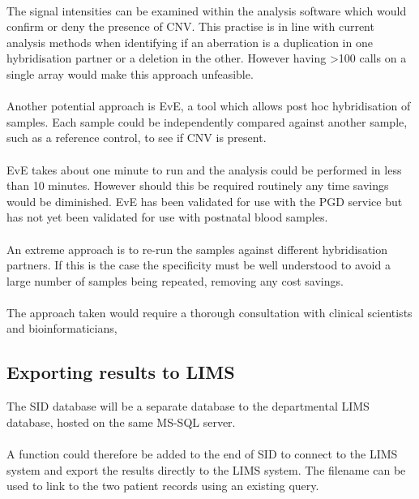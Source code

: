 \paragraph*{}
The signal intensities can be examined within the analysis software which would confirm or deny the presence of CNV. This practise is in line with current analysis methods when identifying if an aberration is a duplication in one hybridisation partner or a deletion in the other. However having \textgreater 100 calls on a single array would make this approach unfeasible.
\paragraph*{}
Another potential approach is EvE, a tool which allows post hoc hybridisation of samples. Each sample could be independently compared against another sample, such as a reference control, to see if CNV is present. 
\paragraph*{}
EvE takes about one minute to run and the analysis could be performed in less than 10 minutes. However should this be required routinely any time savings would be diminished.
EvE has been validated for use with the PGD service but has not yet been validated for use with postnatal blood samples.
\paragraph*{}
An extreme approach is to re-run the samples against different hybridisation partners. If this is the case the specificity must be well understood to avoid a large number of samples being repeated, removing any cost savings.
\paragraph*{}
The approach taken would require a thorough consultation with clinical scientists and bioinformaticians,

\subsection{Exporting results to LIMS}
The SID database will be a separate database to the departmental LIMS database, hosted on the same MS-SQL server.
\paragraph*{}
A function could therefore be added to the end of SID to connect to the LIMS system and export the results directly to the LIMS system. The filename can be used to link to the two patient records using an existing query.
